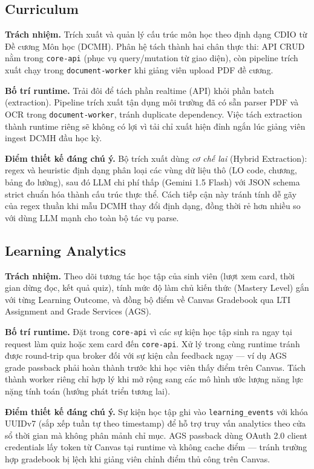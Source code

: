 \subsection{Curriculum}

\textbf{Trách nhiệm.} Trích xuất và quản lý cấu trúc môn học theo định
dạng CDIO từ Đề cương Môn học (DCMH). Phân hệ tách thành hai chân thực
thi: API CRUD nằm trong \texttt{core-api} (phục vụ query/mutation từ giao
diện), còn pipeline trích xuất chạy trong \texttt{document-worker} khi
giảng viên upload PDF đề cương.

\textbf{Bố trí runtime.} Trải đôi để tách phần realtime (API) khỏi phần
batch (extraction). Pipeline trích xuất tận dụng môi trường đã có sẵn
parser PDF và OCR trong \texttt{document-worker}, tránh duplicate
dependency. Việc tách extraction thành runtime riêng sẽ không có lợi vì
tải chỉ xuất hiện đỉnh ngắn lúc giảng viên ingest DCMH đầu học kỳ.

\textbf{Điểm thiết kế đáng chú ý.} Bộ trích xuất dùng \emph{cơ chế lai}
(Hybrid Extraction): regex và heuristic định dạng phân loại các vùng dữ
liệu thô (LO code, chương, bảng đo lường), sau đó LLM chi phí thấp
(Gemini 1.5 Flash) với JSON schema strict chuẩn hóa thành cấu trúc thực
thể. Cách tiếp cận này tránh tính dễ gãy của regex thuần khi mẫu DCMH
thay đổi định dạng, đồng thời rẻ hơn nhiều so với dùng LLM mạnh cho toàn
bộ tác vụ parse.

\subsection{Learning Analytics}

\textbf{Trách nhiệm.} Theo dõi tương tác học tập của sinh viên (lượt xem
card, thời gian dừng đọc, kết quả quiz), tính mức độ làm chủ kiến thức
(Mastery Level) gắn với từng Learning Outcome, và đồng bộ điểm về Canvas
Gradebook qua LTI Assignment and Grade Services (AGS).

\textbf{Bố trí runtime.} Đặt trong \texttt{core-api} vì các sự kiện học
tập sinh ra ngay tại request làm quiz hoặc xem card đến \texttt{core-api}.
Xử lý trong cùng runtime tránh được round-trip qua broker đối với sự
kiện cần feedback ngay --- ví dụ AGS grade passback phải hoàn thành
trước khi học viên thấy điểm trên Canvas. Tách thành worker riêng chỉ
hợp lý khi mở rộng sang các mô hình ước lượng năng lực nặng tính toán
(hướng phát triển tương lai).

\textbf{Điểm thiết kế đáng chú ý.} Sự kiện học tập ghi vào
\texttt{learning\_events} với khóa UUIDv7 (sắp xếp tuần tự theo timestamp)
để hỗ trợ truy vấn analytics theo cửa sổ thời gian mà không phân mảnh chỉ
mục. AGS passback dùng OAuth 2.0 client credentials lấy token từ Canvas
tại runtime và không cache điểm --- tránh trường hợp gradebook bị lệch khi
giảng viên chỉnh điểm thủ công trên Canvas.

